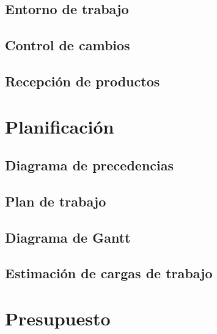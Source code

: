 \subsection{Entorno de trabajo}

\subsection{Control de cambios}

\subsection{Recepción de productos}

\section{Planificación}

\subsection{Diagrama de precedencias}

\subsection{Plan de trabajo}

\subsection{Diagrama de Gantt}

\subsection{Estimación de cargas de trabajo}

\section{Presupuesto}